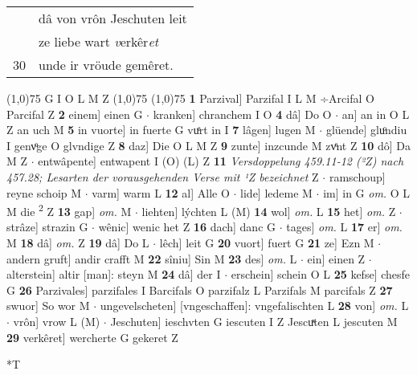 \documentclass[8pt,a4paper,notitlepage]{article}
\begin{document}
\begin{table}[ht]
\begin{minipage}[t]{0.5\linewidth}
\begin{tabular}{rl}
 & dâ von vrôn Jeschuten leit\\ 
 & ze liebe wart \textit{v}erkêr\textit{et}\\ 
30 & unde ir vröude gemêret.\\ 
\end{tabular}
\scriptsize
\line(1,0){75} \newline
G I O L M Z \newline
\line(1,0){75} \newline
\newline
\line(1,0){75} \newline
\textbf{1} Parzival] Parzifal I L M ÷Arcifal O Parcifal Z \textbf{2} einem] einen G  $\cdot$ kranken] chranchem I O \textbf{4} dâ] Do O  $\cdot$ an] an in O L Z an uch M \textbf{5} in vuorte] in fuerte G vuͤrt in I \textbf{7} lâgen] lugen M  $\cdot$ glüende] gluͦndiu I genvͦge O glvndige Z \textbf{8} daz] Die O L M Z \textbf{9} zunte] inzcunde M zvͤnt Z \textbf{10} dô] Da M Z  $\cdot$ entwâpente] entwapent I (O) (L) Z \textbf{11} \textit{Versdoppelung 459.11-12 (²Z) nach 457.28; Lesarten der vorausgehenden Verse mit ¹Z bezeichnet} Z   $\cdot$ ramschoup] reyne schoip M  $\cdot$ varm] warm L \textbf{12} al] Alle O  $\cdot$ lide] ledeme M  $\cdot$ im] in G \textit{om.} O L M die \textsuperscript{2}\hspace{-1.3mm} Z \textbf{13} gap] \textit{om.} M  $\cdot$ liehten] lýchten L (M) \textbf{14} wol] \textit{om.} L \textbf{15} het] \textit{om.} Z  $\cdot$ strâze] strazin G  $\cdot$ wênic] wenic het Z \textbf{16} dach] danc G  $\cdot$ tages] \textit{om.} L \textbf{17} er] \textit{om.} M \textbf{18} dâ] \textit{om.} Z \textbf{19} dâ] Do L  $\cdot$ lêch] leit G \textbf{20} vuort] fuert G \textbf{21} ze] Ezn M  $\cdot$ andern gruft] andir crafft M \textbf{22} sîniu] Sin M \textbf{23} des] \textit{om.} L  $\cdot$ ein] einen Z  $\cdot$ alterstein] altir [man]: steyn M \textbf{24} dâ] der I  $\cdot$ erschein] schein O L \textbf{25} kefse] chesfe G \textbf{26} Parzivales] parzifales I Barcifals O parzifalz L Parzifals M parcifals Z \textbf{27} swuor] So wor M  $\cdot$ ungevelscheten] [vngeschaffen]: vngefalischten L \textbf{28} von] \textit{om.} L  $\cdot$ vrôn] vrow L (M)  $\cdot$ Jeschuten] ieschvten G iescuten I Z Jescuͯten L jescuten M \textbf{29} verkêret] wercherte G gekeret Z \newline
\end{minipage}
\hspace{0.5cm}
\begin{minipage}[t]{0.5\linewidth}
\small
\begin{center}*T

\end{center}
\end{minipage}
\end{table}
\end{document}
